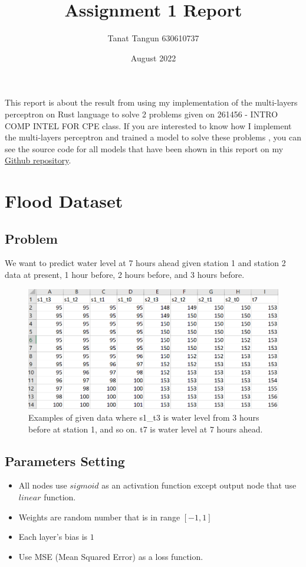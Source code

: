 \documentclass{article}
\title{Assignment 1 Report}
\author{Tanat Tangun 630610737}
\date{August 2022}
\begin{document}
\maketitle

This report is about the result from using my implementation of the multi-layers perceptron
on Rust language to solve 2 problems given on 261456 - INTRO COMP INTEL FOR CPE class. 
If you are interested to know how I implement the multi-layers perceptron and trained a model to solve these problems
, you can see the source code for all models that have been shown in this report on my 
\href{https://github.com/RiwEZ/MLPOnRust}{Github repository}.

\section*{Flood Dataset}
\label{section:1}
\subsection*{Problem}
We want to predict water level at 7 hours ahead given station 1 and station 2 
data at present, 1 hour before, 2 hours before, and 3 hours before. 
\begin{figure}[ht]
	\includegraphics[width=\textwidth]{flood_data}
	\caption{Examples of given data
		where s1\_t3 is water level from 3 hours before at station 1, and so on.
		t7 is water level at 7 hours ahead.}
	\label{fig:1}
\end{figure}

\subsection*{Parameters Setting}
\begin{itemize}
	\item All nodes use $sigmoid$ as an activation function except output node that use $linear$ function.
	\item Weights are random number that is in range $[-1, 1]$
	\item Each layer's bias is $1$
	\item Use MSE (Mean Squared Error) as a loss function.
\end{itemize}
\end{document}
